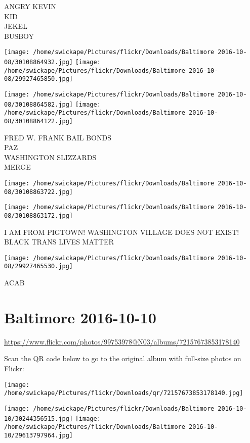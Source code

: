 \documentclass[10pt,letterpaper]{article}
\begin{document}
ANGRY KEVIN\\
KID\\
JEKEL\\
BUSBOY
\pagebreak

\texttt{[image: /home/swickape/Pictures/flickr/Downloads/Baltimore 2016-10-08/30108864932.jpg]}
\texttt{[image: /home/swickape/Pictures/flickr/Downloads/Baltimore 2016-10-08/29927465850.jpg]}

\texttt{[image: /home/swickape/Pictures/flickr/Downloads/Baltimore 2016-10-08/30108864582.jpg]}
\texttt{[image: /home/swickape/Pictures/flickr/Downloads/Baltimore 2016-10-08/30108864122.jpg]}

FRED W. FRANK BAIL BONDS\\
PAZ\\
WASHINGTON SLIZZARDS\\
MERGE
\pagebreak

\texttt{[image: /home/swickape/Pictures/flickr/Downloads/Baltimore 2016-10-08/30108863722.jpg]}

\vspace{0.25in}
\texttt{[image: /home/swickape/Pictures/flickr/Downloads/Baltimore 2016-10-08/30108863172.jpg]}

I AM FROM PIGTOWN!  WASHINGTON VILLAGE DOES NOT EXIST!\\
BLACK TRANS LIVES MATTER
\pagebreak

\texttt{[image: /home/swickape/Pictures/flickr/Downloads/Baltimore 2016-10-08/29927465530.jpg]}

ACAB
\pagebreak

\section*{Baltimore 2016-10-10}

\url{https://www.flickr.com/photos/99753978@N03/albums/72157673853178140}

Scan the QR code below to go to the original album with full-size photos on Flickr:

\texttt{[image: /home/swickape/Pictures/flickr/Downloads/qr/72157673853178140.jpg]}
\pagebreak

\texttt{[image: /home/swickape/Pictures/flickr/Downloads/Baltimore 2016-10-10/30244356515.jpg]}
\texttt{[image: /home/swickape/Pictures/flickr/Downloads/Baltimore 2016-10-10/29613797964.jpg]}
\end{document}
